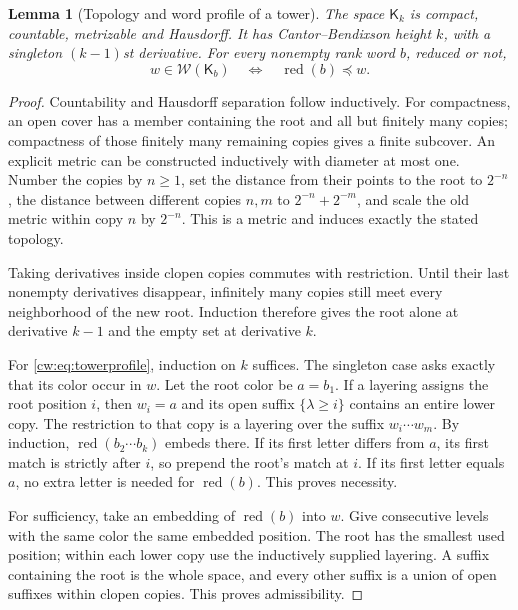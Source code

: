 \documentclass[11pt,letterpaper]{article}
\numberwithin{equation}{section}
\newtheorem{lemma}[lemma]{Lemma}
\theoremstyle{definition}
\theoremstyle{remark}
\theoremstyle{definition}
\newcommand{\W}{\mathcal W}
\newcommand{\red}{\operatorname{red}}
\newcommand{\Tw}{\mathsf K}
\begin{document}
\begin{lemma}[Topology and word profile of a tower]\label{cw:lem:tower}
The space $\Tw_k$ is compact, countable, metrizable and Hausdorff. It has
Cantor--Bendixson height $k$, with a singleton $(k-1)$st derivative.
For every nonempty rank word $b$, reduced or not,
\begin{equation}\label{cw:eq:towerprofile}
 w\in\W(\Tw_b)\quad\Longleftrightarrow\quad \red(b)\preceq w.
\end{equation}
\end{lemma}
\begin{proof}
Countability and Hausdorff separation follow inductively. For compactness,
an open cover has a member containing the root and all but finitely many
copies; compactness of those finitely many remaining copies gives a finite
subcover. An explicit metric can be constructed inductively with diameter
at most one. Number the copies by $n\ge1$, set the distance from their
points to the root to $2^{-n}$, the distance between different copies $n,m$
to $2^{-n}+2^{-m}$, and scale the old metric within copy $n$ by $2^{-n}$.
This is a metric and induces exactly the stated topology.

Taking derivatives inside clopen copies commutes with restriction. Until
their last nonempty derivatives disappear, infinitely many copies still
meet every neighborhood of the new root. Induction therefore gives the
root alone at derivative $k-1$ and the empty set at derivative $k$.

For \eqref{cw:eq:towerprofile}, induction on $k$ suffices. The singleton case
asks exactly that its color occur in $w$. Let the root color be $a=b_1$.
If a layering assigns the root position $i$, then $w_i=a$ and its open
suffix $\{\lambda\ge i\}$ contains an entire lower copy. The restriction to
that copy is a layering over the suffix $w_i\cdots w_m$. By induction,
$\red(b_2\cdots b_k)$ embeds there. If its first letter differs from $a$,
its first match is strictly after $i$, so prepend the root's match at $i$.
If its first letter equals $a$, no extra letter is needed for $\red(b)$.
This proves necessity.

For sufficiency, take an embedding of $\red(b)$ into $w$. Give consecutive
levels with the same color the same embedded position. The root has the
smallest used position; within each lower copy use the inductively supplied
layering. A suffix containing the root is the whole space, and every other
suffix is a union of open suffixes within clopen copies. This proves
admissibility.
\end{proof}
\end{document}
